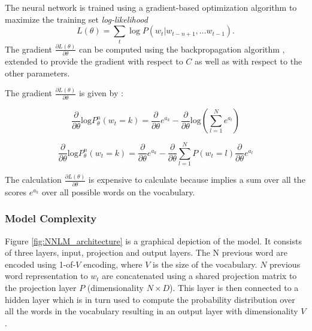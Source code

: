The neural network is trained using a gradient-based optimization algorithm
to maximize the training set \textit{log-likelihood}
\begin{equation}
 L(\theta) = \sum_t \log P(w_t | w_{t-n+1}, \ldots w_{t-1}) .
\end{equation}
The gradient $\frac{\partial L(\theta)}{\partial \theta}$
can be computed using the backpropagation algorithm \cite{Bishop:1995:NNP:525960}, extended
to provide the gradient with respect to $C$ as well as with
respect to the other parameters. 



The gradient   $\frac{\partial L(\theta)}{\partial
  \theta}$   is given by  :



\begin{equation*}
  \label{eq:nnlm-grad}
  \frac{\partial }{\partial \theta}\text{log}P_{\theta}^{n}(w_t=k) =
  \frac{\partial }{\partial \theta} e^{a_k} -  \frac{\partial }{\partial
    \theta}\text{log} \left( \sum_{l=1}^N e^{a_l} \right)
 \end{equation*}

\begin{equation}
\label{eq:dlogp-gradient}
  \frac{\partial }{\partial \theta}\text{log}P_{\theta}^{n}(w_t=k)  =  \frac{\partial }{\partial \theta} e^{a_k}  -   \frac{\partial }{\partial
    \theta}  \sum_{l=1}^N  P(w_t = l)  \frac{\partial }{\partial
    \theta}  e^{a_l}   
\end{equation}


The calculation  $\frac{\partial L(\theta)}{\partial
  \theta}$ is  expensive to calculate because implies a sum over all the scores $e^{a_{k}}$ over all possible words on the vocabulary.


\subsubsection{Model Complexity}
\label{sec:sub:sub:bengio_nnlm_complexity}

Figure \ref{fig:NNLM_architecture} is a graphical depiction of  the model.
It consists of three layers, input, projection and output layers. The N
previous word are encoded using 1-of-$V$ encoding, where $V$ is the size
of the vocabulary. $N$ previous word representation to $w_t$  are concatenated using a
shared projection matrix to the projection layer $P$ (dimensionality $N
\times D$).  This layer is then connected to a hidden layer which is in turn
used to compute the probability distribution over all the words in the
vocabulary resulting in an output layer with dimensionality $V$.

